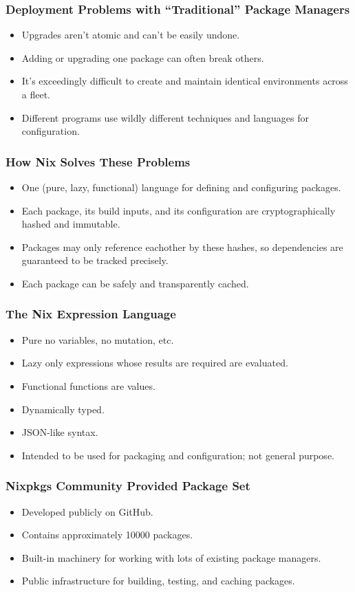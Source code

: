 \documentclass{beamer}
\begin{document}
\begin{frame}
\frametitle{Deployment Problems with ``Traditional'' Package Managers}
\begin{itemize}
\item Upgrades aren't atomic and can't be easily undone.
\item Adding or upgrading one package can often break others.
\item It's exceedingly difficult to create and maintain identical environments across a fleet.
\item Different programs use wildly different techniques and languages for configuration.
\end{itemize}
\end{frame}

\begin{frame}
\frametitle{How Nix Solves These Problems}
\begin{itemize}
\item One (pure, lazy, functional) language for defining and configuring packages.
\item Each package, its build inputs, and its configuration are cryptographically hashed and immutable.
\item Packages may only reference eachother by these hashes, so dependencies are guaranteed to be tracked precisely.
\item Each package can be safely and transparently cached.
\end{itemize}
\end{frame}

\begin{frame}
\frametitle{The Nix Expression Language}
\begin{itemize}
\item Pure \textemdash no variables, no mutation, etc.
\item Lazy \textemdash only expressions whose results are required are evaluated.
\item Functional \textemdash functions are values.
\item Dynamically typed.
\item JSON-like syntax.
\item Intended to be used for packaging and configuration; not general purpose.
\end{itemize}
\end{frame}

\begin{frame}
\frametitle{Nixpkgs \textemdash Community Provided Package Set}
\begin{itemize}
\item Developed publicly on GitHub.
\item Contains approximately 10000 packages.
\item Built-in machinery for working with lots of existing package managers.
\item Public infrastructure for building, testing, and caching packages.
\end{itemize}
\end{frame}
\end{document}
